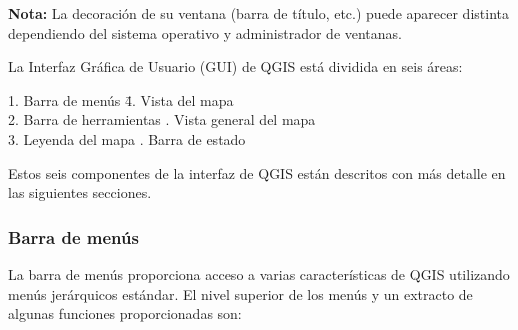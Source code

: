 \textbf{Nota:} La decoración de su ventana (barra de título, etc.) puede aparecer 
distinta dependiendo del sistema operativo y administrador de ventanas.

La Interfaz Gráfica de Usuario (GUI) de QGIS está dividida en seis áreas:

\begin{tabbing}
1. Barra de menús \hspace{3cm}\= 4. Vista del mapa \\
2. Barra de herramientas \hspace{3cm}. Vista general del mapa \\
3. Leyenda del mapa \hspace{3cm}. Barra de estado   
\end{tabbing}

Estos seis componentes de la interfaz de QGIS están descritos con más detalle
en las siguientes secciones.

\subsubsection{Barra de menús}\label{label_menubar}

La barra de menús proporciona acceso a varias características de QGIS utilizando 
menús jerárquicos estándar. El nivel superior de los menús y un extracto de 
algunas funciones proporcionadas son:

